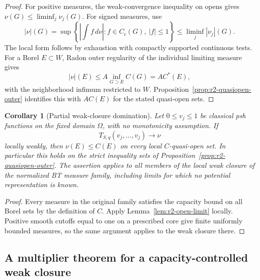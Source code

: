 \documentclass[11pt,a4paper]{article}
\numberwithin{equation}{section}
\newtheorem{corollary}[theorem]{Corollary}
\theoremstyle{definition}
\theoremstyle{remark}
\begin{document}
\begin{proof}
For positive measures, the weak-convergence inequality on opens
gives $\nu(G)\leq\liminf_j\nu_j(G)$. For signed measures, use
\[
 |\nu|(G)
  =\sup\left\{\left|\int f\,d\nu\right|:
       f\in C_c(G),\ |f|\leq1\right\}
  \leq\liminf_j|\nu_j|(G).
\]
The local form follows by exhaustion with compactly supported
continuous tests. For a Borel $E\subset W$, Radon outer regularity
of the individual limiting measure gives
\[
 |\nu|(E)\leq A\inf_{G\supset E} C(G)=A C^*(E),
\]
with the neighborhood infimum restricted to $W$.
Proposition~\ref{prop:r2-quasiopen-outer} identifies this with
$A C(E)$ for the stated quasi-open sets.
\end{proof}

\begin{corollary}[Partial weak-closure domination]
\label{cor:r2-quasiopen-domination}
Let $0\leq v_j\leq1$ be classical psh functions on the fixed
domain $\Omega$, with no monotonicity assumption. If
\[
 T_{S,q}(v_j,\ldots,v_j)\longrightarrow\nu
\]
locally weakly, then $\nu(E)\leq C(E)$ on every local
$C$-quasi-open set. In particular this holds on the strict
inequality sets of Proposition~\ref{prop:r2-quasiopen-outer}.
The assertion applies to all members of the local weak closure
of the normalized BT measure family, including limits for which
no potential representation is known.
\end{corollary}

\begin{proof}
Every measure in the original family satisfies the capacity bound
on all Borel sets by the definition of $C$. Apply
Lemma~\ref{lem:r2-open-limit} locally. Positive smooth cutoffs equal
to one on a prescribed core give finite uniformly bounded measures,
so the same argument applies to the weak closure there.
\end{proof}

\subsection{A multiplier theorem for a capacity-controlled weak closure}
\end{document}
